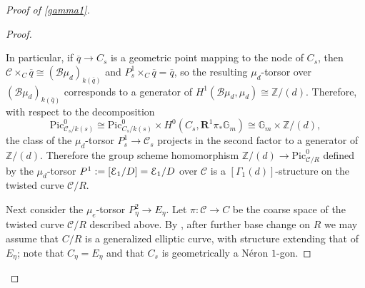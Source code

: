 \documentclass[11pt]{amsart}
\theoremstyle{definition}
\begin{document}
\begin{proof}[Proof of \ref{gamma1}]
\begin{proof}
\begin{center}
\end{center}
In particular, if $\overline{q} \rightarrow C_s$ is a geometric point mapping to the node of $C_s$, then ${\mathcal{C}}\times_C \overline{q} \cong ({\mathcal{B}}\mu_d)_{k(\overline{q})}$ and $P^1_s\times_C \overline{q} = \overline{q}$, so the resulting $\mu_d$-torsor over $({\mathcal{B}}\mu_d)_{k(\overline{q})}$ corresponds to a generator of $H^1({\mathcal{B}}\mu_d, \mu_d) \cong \mathbb{Z}/(d)$. Therefore, with respect to the decomposition 
\begin{displaymath}
\mathrm{Pic}^0_{{\mathcal{C}}_s/k(s)} \cong \mathrm{Pic}^0_{C_s/k(s)} \times H^0 (C_s, \mathbf{R}^1\pi_* \mathbb{G}_m) \cong \mathbb{G}_m \times \mathbb{Z}/(d),
\end{displaymath}
the class of the $\mu_d$-torsor $P^1_s \rightarrow {\mathcal{C}}_s$ projects in the second factor to a generator of $\mathbb{Z}/(d)$. Therefore the group scheme homomorphism $\mathbb{Z}/(d) \rightarrow \mathrm{Pic}^0_{{\mathcal{C}}/R}$ defined by the $\mu_d$-torsor $P^1 := [{\mathbf{\EuScript{E}}}_1/D] = {\mathbf{\EuScript{E}}}_1/D$ over ${\mathcal{C}}$ is a $[\Gamma_1(d)]$-structure on the twisted curve ${\mathcal{C}}/R$.

Next consider the $\mu_e$-torsor $P^2_\eta \rightarrow E_\eta$. Let $\pi: {\mathcal{C}} \rightarrow C$ be the coarse space of the twisted curve ${\mathcal{C}}/R$ described above. By \cite[IV.1.6]{DR}, after further base change on $R$ we may assume that $C/R$ is a generalized elliptic curve, with structure extending that of $E_\eta$; note that $C_\eta = E_\eta$ and that $C_s$ is geometrically a N\'eron $1$-gon. 


\end{proof}
\end{proof}
\end{document}
